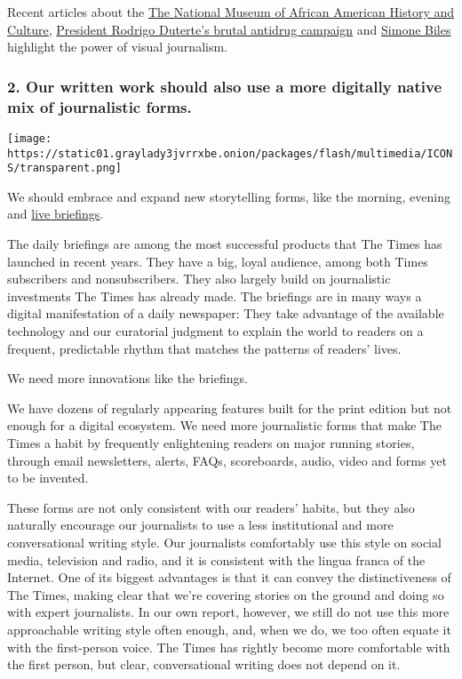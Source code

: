 Recent articles about the
\href{https://www.nytimes3xbfgragh.onion/interactive/2016/09/15/arts/design/national-museum-of-african-american-history-and-culture.html}{The
National Museum of African American History and Culture},
\href{https://www.nytimes3xbfgragh.onion/interactive/2016/12/07/world/asia/rodrigo-duterte-philippines-drugs-killings.html}{President
Rodrigo Duterte's brutal antidrug campaign} and
\href{https://www.nytimes3xbfgragh.onion/interactive/2016/08/05/sports/olympics-gymnast-simone-biles.html}{Simone
Biles} highlight the power of visual journalism.

\hypertarget{2-our-written-work-should-also-use-a-more-digitally-native-mix-of-journalistic-forms}{%
\subsubsection{2. Our written work should also use a more digitally
native mix of journalistic
forms.}\label{2-our-written-work-should-also-use-a-more-digitally-native-mix-of-journalistic-forms}}

\texttt{[image: https://static01.graylady3jvrrxbe.onion/packages/flash/multimedia/ICONS/transparent.png]}

We should embrace and expand new storytelling forms, like the morning,
evening and
\href{https://www.nytimes3xbfgragh.onion/2017/01/12/us/politics/trump-cabinet-hearing.html}{live
briefings}.

The daily briefings are among the most successful products that The
Times has launched in recent years. They have a big, loyal audience,
among both Times subscribers and nonsubscribers. They also largely build
on journalistic investments The Times has already made. The briefings
are in many ways a digital manifestation of a daily newspaper: They take
advantage of the available technology and our curatorial judgment to
explain the world to readers on a frequent, predictable rhythm that
matches the patterns of readers' lives.

We need more innovations like the briefings.

We have dozens of regularly appearing features built for the print
edition but not enough for a digital ecosystem. We need more
journalistic forms that make The Times a habit by frequently
enlightening readers on major running stories, through email
newsletters, alerts, FAQs, scoreboards, audio, video and forms yet to be
invented.

These forms are not only consistent with our readers' habits, but they
also naturally encourage our journalists to use a less institutional and
more conversational writing style. Our journalists comfortably use this
style on social media, television and radio, and it is consistent with
the lingua franca of the Internet. One of its biggest advantages is that
it can convey the distinctiveness of The Times, making clear that we're
covering stories on the ground and doing so with expert journalists. In
our own report, however, we still do not use this more approachable
writing style often enough, and, when we do, we too often equate it with
the first-person voice. The Times has rightly become more comfortable
with the first person, but clear, conversational writing does not depend
on it.

